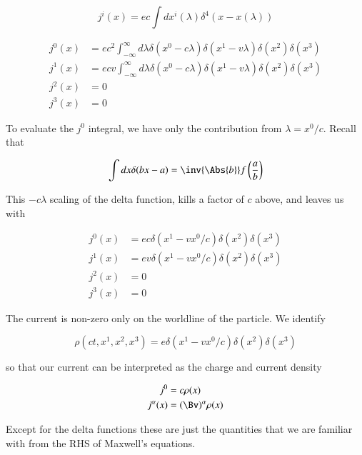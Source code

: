 \begin{equation}\label{eqn:relativisticElectrodynamicsL12:470}
j^i(x) = e c \int dx^i(\lambda) \delta^4 (x - x(\lambda))
\end{equation}

\begin{align}\label{eqn:relativisticElectrodynamicsL12:490}
j^0(x) &= e c^2  \int_{-\infty}^\infty d\lambda \delta(x^0 -  c \lambda) \delta(x^1 -  v \lambda) \delta(x^2) \delta(x^3) \\
j^1(x) &= e c v  \int_{-\infty}^\infty d\lambda \delta(x^0 -  c \lambda) \delta(x^1 -  v \lambda) \delta(x^2) \delta(x^3) \\
j^2(x) &= 0 \\
j^3(x) &= 0
\end{align}

To evaluate the $j^0$ integral, we have only the contribution from $\lambda = x^0/ c$.  Recall that 

\begin{equation}\label{eqn:relativisticElectrodynamicsL12:510}
\int dx \delta( b x - a) = \inv{\Abs{b}} f\left( \frac{a}{b} \right)
\end{equation}

This $- c\lambda$ scaling of the delta function, kills a factor of $c $ above, and leaves us with

\begin{align}\label{eqn:relativisticElectrodynamicsL12:530}
j^0(x) &= e c \delta(x^1 - v x^0/c) \delta(x^2) \delta(x^3) \\
j^1(x) &= e v \delta(x^1 - v x^0/c) \delta(x^2) \delta(x^3) \\
j^2(x) &= 0 \\
j^3(x) &= 0 
\end{align}

The current is non-zero only on the worldline of the particle.  We identify

\begin{equation}\label{eqn:relativisticElectrodynamicsL12:550}
\rho(ct, x^1, x^2, x^3) = e \delta(x^1 - v x^0/c) \delta(x^2) \delta(x^3) 
\end{equation}

so that our current can be interpreted as the charge and current density 

\begin{align}\label{eqn:relativisticElectrodynamicsL12:570}
j^0 &= c \rho(x) \\
j^\alpha(x) &= (\Bv)^\alpha \rho(x)
\end{align}

Except for the delta functions these are just the quantities that we are familiar with from the RHS of Maxwell's equations.

\EndArticle
